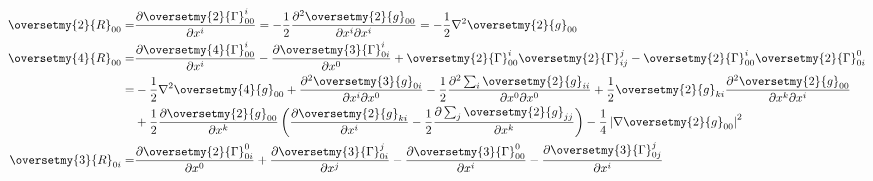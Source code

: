 \begin{subequations}\label{chppn:eqn_ricciijk}
\begin{align}
    \oversetmy{2}{R}_{00} =& \frac{\partial \oversetmy{2}{\Gamma}^i_{00}}{\partial x^i}
      = -\frac{1}{2}\frac{\partial^2 \oversetmy{2}{g}_{00}} {\partial x^i \partial x^i}
      = -\frac{1}{2} \nabla^2 \oversetmy{2}{g}_{00} \\
    \oversetmy{4}{R}_{00} =& \frac{\partial \oversetmy{4}{\Gamma}^i_{00}}{\partial x^i}
       -\frac{\partial \oversetmy{3}{\Gamma}^i_{0i}}{\partial x^0}
       + \oversetmy{2}{\Gamma}^i_{00} \oversetmy{2}{\Gamma}^j_{ij}
       - \oversetmy{2}{\Gamma}^i_{00} \oversetmy{2}{\Gamma}^0_{0i}   \notag\\
       =& -\frac{1}{2} \nabla^2 \oversetmy{4}{g}_{00}
        +\frac{\partial^2 \oversetmy{3}{g}_{0i}} {\partial x^i \partial x^0}
        -\frac{1}{2} \frac{\partial^2 \sum_{i} \oversetmy{2}{g}_{ii}  }{\partial x^0\partial x^0}
        +\frac{1}{2}\oversetmy{2}{g}_{ki}\frac{\partial^2 \oversetmy{2}{g}_{00}}
         {\partial x^k\partial x^i} \notag \\
        &+\frac{1}{2} \frac{\partial \oversetmy{2}{g}_{00}} {\partial x^k}
         \left(\frac{\partial\oversetmy{2}{g}_{ki}}{\partial x^i}
        -\frac{1}{2}\frac{\partial \sum_{j}\oversetmy{2}{g}_{jj}} {\partial x^k} \right)
        -\frac{1}{4} \left|\nabla \oversetmy{2}{g}_{00} \right|^2          \\
    \oversetmy{3}{R}_{0i} =& \frac{\partial \oversetmy{2}{\Gamma}^0_{0i}}{\partial x^0}
       +\frac{\partial \oversetmy{3}{\Gamma}^j_{0i}}{\partial x^j}
       -\frac{\partial \oversetmy{3}{\Gamma}^0_{00}}{\partial x^i}
       -\frac{\partial \oversetmy{3}{\Gamma}^j_{0j}}{\partial x^i} \notag \\

\end{align}
\end{subequations}
